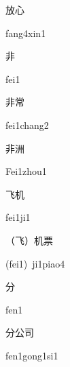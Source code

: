 \begin{multicols*}{2}
\begin{verbete}{放心}
\begin{pronuncia}{fang4xin1}
\end{pronuncia}
\end{verbete}

\begin{verbete}[fei1]{非}
\begin{pronuncia}{fei1}
\end{pronuncia}
\end{verbete}

\begin{verbete}{非常}
\begin{pronuncia}{fei1chang2}
\end{pronuncia}
\end{verbete}

\begin{verbete}{非洲}
\begin{pronuncia}{Fei1zhou1}
\end{pronuncia}
\end{verbete}

\begin{verbete}[fei1ji1]{飞机}
\begin{pronuncia}{fei1ji1}
\end{pronuncia}
\end{verbete}

\begin{verbete}{（飞）机票}
\begin{pronuncia}{(fei1)\ ji1piao4}
\end{pronuncia}
\end{verbete}

\begin{verbete}[fen1]{分}
\begin{pronuncia}{fen1}
\end{pronuncia}
\end{verbete}

\begin{verbete}{分公司}
\begin{pronuncia}{fen1gong1si1}
\end{pronuncia}
\end{verbete}


\end{multicols*}
